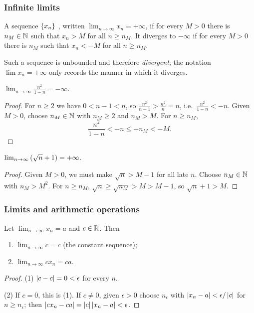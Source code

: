 \subsubsection{Infinite limits}
\begin{definition}
    A sequence $\left\{x_n\right\}$ , written
    $\lim_{n\to\infty}x_n=+\infty$, if for every $M>0$ there is
    $n_M\in\mathbb{N}$ such that $x_n>M$ for all $n\geq n_M$. It diverges to
    $-\infty$ if for every $M>0$ there is $n_M$ such that $x_n<-M$ for all
    $n\geq n_M$.
\end{definition}

Such a sequence is unbounded and therefore \emph{divergent}; the notation
$\lim x_n=\pm\infty$ only records the manner in which it diverges.

\begin{example}
    $\lim_{n\to\infty}\frac{n^2}{1-n}=-\infty$.
\end{example}

\begin{proof}
    For $n\geq2$ we have $0<n-1<n$, so
    $\frac{n^2}{n-1}>\frac{n^2}{n}=n$, i.e.\ $\frac{n^2}{1-n}<-n$. Given
    $M>0$, choose $n_M\in\mathbb{N}$ with $n_M\geq2$ and $n_M>M$. For $n\geq n_M$,
    \begin{equation*}
        \frac{n^2}{1-n}<-n\leq-n_M<-M.
    \end{equation*}
\end{proof}

\begin{example}
    $\lim_{n\to\infty}\left(\sqrt{n}+1\right)=+\infty$.
\end{example}

\begin{proof}
    Given $M>0$, we must make $\sqrt n>M-1$ for all late $n$. Choose
    $n_M\in\mathbb{N}$ with $n_M>M^2$. For $n\geq n_M$,
    $\sqrt n\geq\sqrt{n_M}>M>M-1$, so $\sqrt n+1>M$.
\end{proof}

\subsubsection{Limits and arithmetic operations}
\begin{theorem}\label{thm:limit-laws}
    Let $\lim_{n\to\infty} x_n = a$ and $c\in\mathbb{R}$. Then
    \begin{enumerate}[label=(\arabic*)]
        \item $\lim_{n \to \infty} c = c$ (the constant sequence);
        \item $\lim_{n \to \infty} cx_n = ca$.
    \end{enumerate}
\end{theorem}

\begin{proof}
    (1) $\left|c-c\right|=0<\epsilon$ for every $n$.

    (2) If $c=0$, this is (1). If $c\neq0$, given $\epsilon>0$ choose
    $n_\epsilon$ with $\left|x_n-a\right|<\epsilon/\left|c\right|$ for $n\geq n_\epsilon$;
    then $\left|cx_n-ca\right|=\left|c\right|\left|x_n-a\right|<\epsilon$.
\end{proof}
